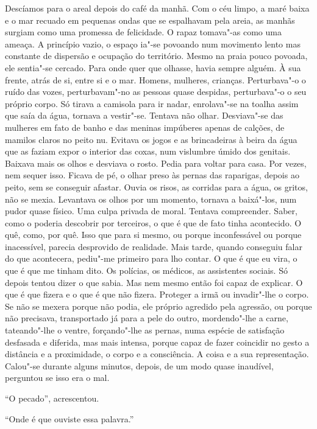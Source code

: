 Descíamos para o areal depois do café da manhã. Com o céu limpo, a
maré baixa e o mar recuado em pequenas ondas que se espalhavam pela
areia, as manhãs surgiam como uma promessa de felicidade. O rapaz
tomava"-as como uma ameaça. A princípio vazio, o espaço ia"-se povoando
num movimento lento mas constante de dispersão e ocupação do território.
Mesmo na praia pouco povoada, ele sentia"-se cercado. Para onde quer que
olhasse, havia sempre alguém. À sua frente, atrás de si, entre si e o
mar. Homens, mulheres, crianças. Perturbava"-o o ruído das vozes,
perturbavam"-no as pessoas quase despidas, perturbava"-o o seu próprio
corpo. Só tirava a camisola para ir nadar, enrolava"-se na toalha assim
que saía da água, tornava a vestir"-se. Tentava não olhar. Desviava"-se
das mulheres em fato de banho e das meninas impúberes apenas de calções,
de mamilos claros no peito nu. Evitava os jogos e as brincadeiras à
beira da água que as faziam expor o interior das coxas, num vislumbre
úmido dos genitais. Baixava mais os olhos e desviava o rosto. Pedia
para voltar para casa. Por vezes, nem sequer isso. Ficava de pé, o olhar
preso às pernas das raparigas, depois ao peito, sem se conseguir
afastar. Ouvia os risos, as corridas para a água, os gritos, não se
mexia. Levantava os olhos por um momento, tornava a baixá"-los, num
pudor quase físico. Uma culpa privada de moral. Tentava compreender.
Saber, como o poderia descobrir por terceiros, o que é que de fato
tinha acontecido. O quê, como, por quê. Isso que para si mesmo, ou porque
inconfessável ou porque inacessível, parecia desprovido de realidade.
Mais tarde, quando conseguiu falar do que acontecera, pediu"-me primeiro
para lho contar. O que é que eu vira, o que é que me tinham dito. Os
polícias, os médicos, as assistentes sociais. Só depois tentou dizer o
que sabia. Mas nem mesmo então foi capaz de explicar. O que é que fizera
e o que é que não fizera. Proteger a irmã ou invadir"-lhe o corpo. Se
não se mexera porque não podia, ele próprio agredido pela agressão, ou
porque não precisava, transportado já para a pele do outro,
mordendo"-lhe a carne, tateando"-lhe o ventre, forçando"-lhe as pernas,
numa espécie de satisfação desfasada e diferida, mas mais intensa,
porque capaz de fazer coincidir no gesto a distância e a proximidade, o
corpo e a consciência. A coisa e a sua representação. Calou"-se durante
alguns minutos, depois, de um modo quase inaudível, perguntou se isso
era o mal.

``O pecado'',
acrescentou.

``Onde é que ouviste essa palavra.''

